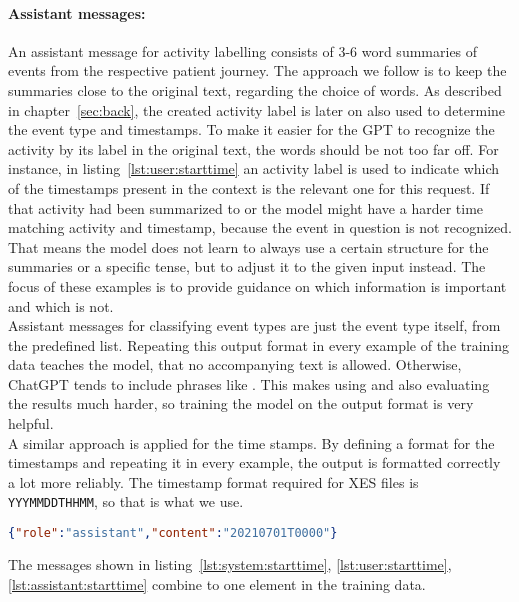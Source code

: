 \paragraph{Assistant messages:} An assistant message for activity labelling consists of 3-6 word summaries of events from the respective patient journey. The approach we follow is to keep the summaries close to the original text, regarding the choice of words. As described in chapter~\ref{sec:back}, the created activity label is later on also used to determine the event type and timestamps. To make it easier for the GPT to recognize the activity by its label in the original text, the words should be not too far off. For instance, in listing~\ref{lst:user:starttime} an activity label is used to indicate which of the timestamps present in the context is the relevant one for this request. If that activity had been summarized to  or  the model might have a harder time matching activity and timestamp, because the event in question is not recognized.\\
That means the model does not learn to always use a certain structure for the summaries or a specific tense, but to adjust it to the given input instead. The focus of these examples is to provide guidance on which information is important and which is not.\\
Assistant messages for classifying event types are just the event type itself, from the predefined list. Repeating this output format in every example of the training data teaches the model, that no accompanying text is allowed. Otherwise, ChatGPT tends to include phrases like . This makes using and also evaluating the results much harder, so training the model on the output format is very helpful. \\
A similar approach is applied for the time stamps. By defining a format for the timestamps and repeating it in every example, the output is formatted correctly a lot more reliably. The timestamp format required for XES files is \verb|YYYMMDDTHHMM|, so that is what we use.
\begin{lstlisting}[language=json, caption={Assistant message for determining an acitivities start timestamp}, label={lst:assistant:starttime}]
{"role":"assistant","content":"20210701T0000"}
\end{lstlisting}

The messages shown in listing~\ref{lst:system:starttime}, \ref{lst:user:starttime}, \ref{lst:assistant:starttime} combine to one element in the training data.\\

